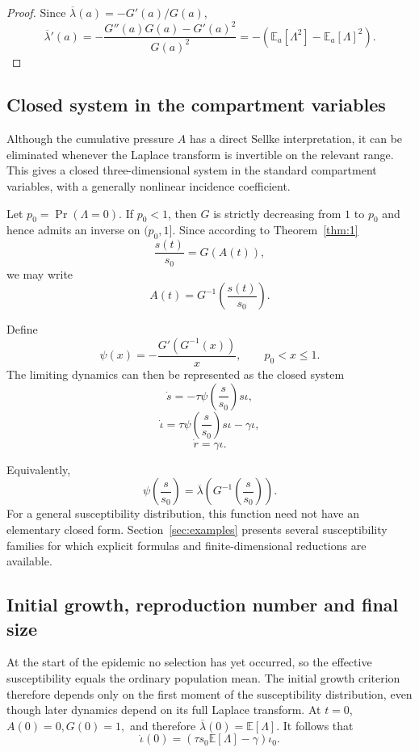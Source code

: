 \documentclass[pdflatex,sn-mathphys-ay]{sn-jnl}
\theoremstyle{thmstyleone}
\theoremstyle{thmstyletwo}
\theoremstyle{thmstylethree}
\newcommand{\E}{\mathbb{E}}
\begin{document}
\begin{proof}
Since \(\overline{\lambda}(a)=-G'(a)/G(a)\),
\[
\overline{\lambda}'(a)
=-\frac{G''(a)G(a)-G'(a)^2}{G(a)^2}
=-\left(\E_a[\Lambda^2]-\E_a[\Lambda]^2\right).
\]
\end{proof}

\subsection{Closed system in the compartment variables}

Although the cumulative pressure \(A\) has a direct Sellke interpretation, it
can be eliminated whenever the Laplace transform is invertible on the relevant
range. This gives a closed three-dimensional system in the standard
compartment variables, with a generally nonlinear incidence coefficient.

Let
\( p_0 =\Pr(\Lambda=0).\)
If \(p_0<1\), then \(G\) is strictly decreasing from \(1\) to \(p_0\) and hence admits an inverse on \((p_0,1]\).
Since according to Theorem~\ref{thm:1}
\[
\frac{s(t)}{s_0}=G(A(t)),
\]
we may write
\[
A(t)=G^{-1}\left(\frac{s(t)}{s_0}\right).
\]

Define
\[
\psi(x)
=
-\frac{
G'\!\left(G^{-1}(x)\right)
}{x},
\qquad p_0<x\leq 1.
\]
The limiting dynamics can then be represented as the closed system
\[
\dot s
=
-\tau
\psi\left(\frac{s}{s_0}\right)s\iota,
\]
\[
\dot\iota
=
\tau
\psi\left(\frac{s}{s_0}\right)s\iota
-\gamma\iota,
\]
\[
\dot r=\gamma\iota.
\]

Equivalently,
\[
\psi\left(\frac{s}{s_0}\right)
=
\overline{\lambda}\left(
G^{-1}\left(\frac{s}{s_0}\right)
\right).
\]
For a general susceptibility distribution, this function need not have an
elementary closed form. Section~\ref{sec:examples} presents several
susceptibility families for which explicit formulas and finite-dimensional
reductions are available.

\subsection{Initial growth,  reproduction number and final size }

At the start of the epidemic no selection has yet occurred, so the effective
susceptibility equals the ordinary population mean. The initial growth
criterion therefore depends only on the first moment of the susceptibility
distribution, even though later dynamics depend on its full Laplace transform.
At \(t=0\),
$A(0)=0,G(0)=1,$
and therefore
$
\overline{\lambda}(0)=\E[\Lambda].
$
It follows that
\[
\dot\iota(0)
=
\left(
\tau s_0\E[\Lambda]-\gamma
\right)\iota_0.
\]
\end{document}
